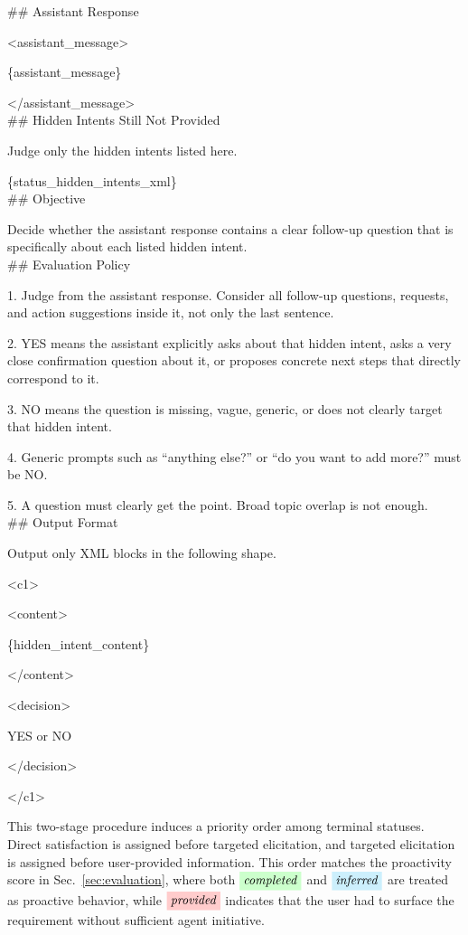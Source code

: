 \documentclass{llmxive}
\providecommand{\tcolorboxPrompt}[2]{\begin{tcolorbox}[
    title=#1,
    colback=cyan!3, 
    colframe=blue!50!black!60,
    rounded corners,
    sharp corners=northeast,
    sharp corners=southwest,
    width=1.00\linewidth,
    boxsep=2pt,
    top=2pt,
    bottom=2pt,
    enhanced,
    breakable,
    before=\setlength{\parindent}{0pt},
]

#2
\end{tcolorbox}
}
\providecommand{\completed}{\colorbox{green!20}{\textit{completed}}}
\providecommand{\inferred}{\colorbox{cyan!20}{\textit{inferred}}}
\providecommand{\provided}{\colorbox{red!20}{\textit{provided}}}
\providecommand{\tcolorboxPromptUserAgentStageTwoCommonText}{\fontsize{7.5}{9}\selectfont}
\providecommand{\tcolorboxPromptUserAgentStageTwoCommonTextLineSkip}{\setlength{\baselineskip}{5 pt}}
\begin{document}
\tcolorboxPrompt{Prompt -- Clarification Checking
}{
\ttfamily
\#\# Assistant Response

<assistant\_message>

\{assistant\_message\}

</assistant\_message> \\

\#\# Hidden Intents Still Not Provided

Judge only the hidden intents listed here.

\{status\_hidden\_intents\_xml\} \\

\#\# Objective

Decide whether the assistant response contains a clear follow-up question that is specifically about each listed hidden intent. \\

\#\# Evaluation Policy

1. Judge from the assistant response. Consider all follow-up questions, requests, and action suggestions inside it, not only the last sentence.

2. YES means the assistant explicitly asks about that hidden intent, asks a very close confirmation question about it, or proposes concrete next steps that directly correspond to it.

3. NO means the question is missing, vague, generic, or does not clearly target that hidden intent.

4. Generic prompts such as ``anything else?'' or ``do you want to add more?'' must be NO.

5. A question must clearly get the point. Broad topic overlap is not enough. \\

\#\# Output Format

Output only XML blocks in the following shape.

<c1>

<content>

\{hidden\_intent\_content\}

</content>

<decision>

YES or NO

</decision>

</c1>
}

This two-stage procedure induces a priority order among terminal statuses. Direct satisfaction is assigned before targeted elicitation, and targeted elicitation is assigned before user-provided information. This order matches the proactivity score in Sec.~\ref{sec:evaluation}, where both $\completed$ and $\inferred$ are treated as proactive behavior, while $\provided$ indicates that the user had to surface the requirement without sufficient agent initiative.
\end{document}
